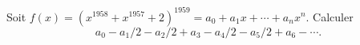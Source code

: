 Soit $f(x) = \left(x^{1958} + x^{1957} + 2\right)^{1959} = a_0 + a_1x + \cdots + a_nx^n$. Calculer
\[ a_0 - a_1/2 - a_2/2 + a_3 - a_4/2 - a_5/2 + a_6 - \cdots. \]
